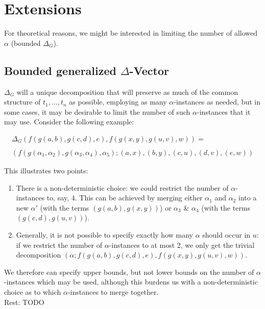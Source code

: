\documentclass[a4paper, 11pt]{report}
\begin{document}
\section{Extensions}

For theoretical reasons, we might be interested in limiting the number of allowed $\alpha$ (bounded $\Delta_G$).

\subsection{Bounded generalized $\Delta$-Vector}

$\Delta_G$ will a unique decomposition that will preserve as much of the common structure of $t_1,\dots,t_n$ as possible, employing as many $\alpha$-instances as needed, but in some cases, it may be desirable to limit the number of such $\alpha$-instances that it may use.
Consider the following example:

$$
\begin{array}{l}
\Delta_G(f(g(a,b),g(c,d),e), f(g(x,y),g(u,v),w)) =\\
\\
(f(g(\alpha_1,\alpha_2),g(\alpha_3,\alpha_4),\alpha_5); (a,x), (b,y), (c,u), (d,v), (e,w))
\end{array}
$$

This illustrates two points:
\begin{enumerate}
\item There is a non-deterministic choice: we could restrict the number of $\alpha$-instances to, say, 4. This can be achieved by merging either $\alpha_1$ and $\alpha_2$ into a new $\alpha'$ (with the terms $(g(a,b),g(x,y))$) or $\alpha_3$ \& $\alpha_4$ (with the terms $(g(c,d),g(u,v))$).
\item Generally, it is not possible to specify exactly how many $\alpha$ should occur in $u$: if we restrict the number of $\alpha$-instances to at most 2, we only get the trivial decomposition $(\alpha; f(g(a,b),g(c,d),e), f(g(x,y),g(u,v),w))$.
\end{enumerate}

We therefore can specify upper bounds, but not lower bounds on the number of $\alpha$-instances which may be used, although this burdens us with a non-deterministic choice as to which $\alpha$-instances to merge together.\\

\noindent
Rest: TODO




\end{document}
